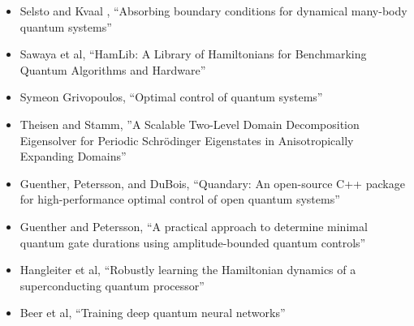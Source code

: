 \documentclass[]{article}
\begin{document}
\begin{itemize}
\item Selsto and Kvaal
\cite{Selsto2010},
``Absorbing boundary conditions for dynamical many-body quantum systems''
\item Sawaya et al\cite{10313872},
  ``HamLib: A Library of Hamiltonians for Benchmarking Quantum Algorithms and Hardware''
\item Symeon Grivopoulos\cite{grivopoulos2005optimal},
 ``Optimal control of quantum systems''
\item Theisen and Stamm\cite{doi:10.1137/23M161848X},
  ''A Scalable Two-Level Domain Decomposition Eigensolver for Periodic Schrödinger Eigenstates in Anisotropically Expanding Domains''
\item Guenther, Petersson, and DuBois\cite{9651392},
  ``Quandary: An open-source C++ package for high-performance optimal control of open quantum systems''
\item Guenther and Petersson\cite{gunther2023practical},
``A practical approach to determine minimal quantum gate durations using amplitude-bounded quantum controls''
\item Hangleiter et al\cite{hangleiter2024robustly},
``Robustly learning the Hamiltonian dynamics of a superconducting quantum processor''
\item Beer et al\cite{beer2020training},
``Training deep quantum neural networks''
\end{itemize}

\begin{comment}

Indicates the timeframe in which the special issue could be produced (to include paper writing, reviewing and submission of final copy to the journal) assuming the proposal is accepted;
Includes a short biography of all authors and guest editors;
Indicates any special timing, associated events, funding support, partnerships or other links or relationships which could influence the development of the issue;
Provides any further information which you feel is relevant.
A special issue normally contains between five and 20 full-length articles, in addition to an editorial written by the special issue organizers. Because it is highly unlikely that all articles submitted for potential inclusion in a special issue will successfully pass the peer review process, it is wise to consider more papers than you anticipate as the upper limit. If fewer than three articles are accepted for publication, the articles will be published as stand-alone articles in the journal.
Once you're ready, use the link below to find your chosen journal and submit your proposal.

https://www.elsevier.com/editor/role/guest/guide

\end{comment}
\end{document}

